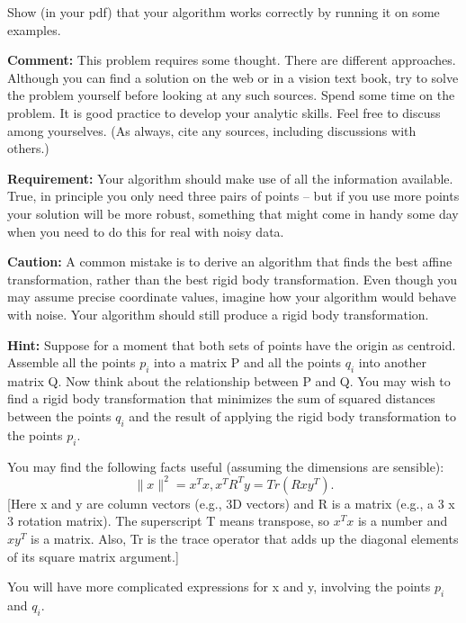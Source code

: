 \documentclass[conference,onecolumn]{IEEEtran}
\begin{document}
\begin{enumerate}[label=\arabic{enumi}.]
          Show (in your pdf) that your algorithm works correctly by running it on some examples.

          \textbf{Comment:} This problem requires some thought.
          There are different approaches.
          Although you can find a solution on the web or in a vision text book, try to solve the problem yourself before looking at any such sources.
          Spend some time on the problem.
          It is good practice to develop your analytic skills.
          Feel free to discuss among yourselves.
          (As always, cite any sources, including discussions with others.)

          \textbf{Requirement:} Your algorithm should make use of all the information available.
          True, in principle you only need three pairs of points -- but if you use more points your solution will be more robust, something that might come in handy some day when you need to do this for real with noisy data.

          \textbf{Caution:} A common mistake is to derive an algorithm that finds the best affine transformation, rather than the best rigid body transformation.
          Even though you may assume precise coordinate values, imagine how your algorithm would behave with noise.
          Your algorithm should still produce a rigid body transformation.

          \textbf{Hint:} Suppose for a moment that both sets of points have the origin as centroid.
          Assemble all the points {$p_i$} into a matrix P and all the points {$q_i$} into another matrix Q.
          Now think about the relationship between P and Q.
          You may wish to ﬁnd a rigid body transformation that minimizes the sum of squared distances between the points {$q_i$} and the result of applying the rigid body transformation to the points {$p_i$}.

          You may ﬁnd the following facts useful (assuming the dimensions are sensible):
          $$
              \|x\|^2 = x^Tx,
              x^TR^Ty = Tr(Rxy^T).
          $$
          [Here x and y are column vectors (e.g., 3D vectors) and R is a matrix (e.g., a 3 x 3 rotation matrix).
                  The superscript T means transpose, so $x^Tx$ is a number and $xy^T$ is a matrix.
                  Also, Tr is the trace operator that adds up the diagonal elements of its square matrix argument.]

          You will have more complicated expressions for x and y, involving the points {$p_i$} and {$q_i$}.


\end{enumerate}
\end{document}
